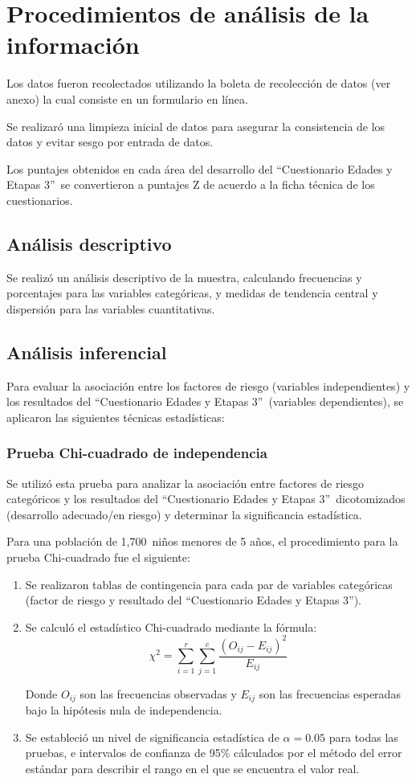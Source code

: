 \documentclass[11pt,letterpaper]{report}
\newcommand{\muestradeseada}{1,700}
\newcommand{\asq}{“Cuestionario Edades y Etapas 3”}
\begin{document}
\section{Procedimientos de análisis de la información}
Los datos fueron recolectados utilizando la boleta de recolección de datos (ver
anexo) la cual consiste en un formulario en línea.

Se realizaró una limpieza inicial de datos para asegurar la consistencia de los
datos y evitar sesgo por entrada de datos.

Los puntajes obtenidos en cada área del desarrollo del \asq\ se convertieron a
puntajes Z de acuerdo a la ficha técnica de los cuestionarios. 
	
\subsection{Análisis descriptivo}
Se realizó un análisis descriptivo de la muestra, calculando frecuencias y
porcentajes para las variables categóricas, y medidas de tendencia central y
dispersión para las variables cuantitativas.

\subsection{Análisis inferencial}
Para evaluar la asociación entre los factores de riesgo (variables
independientes) y los resultados del \asq\ (variables dependientes), se
aplicaron las siguientes técnicas estadísticas:

\subsubsection{Prueba Chi-cuadrado de independencia}
Se utilizó esta prueba para analizar la asociación entre factores de riesgo
categóricos y los resultados del \asq\ dicotomizados (desarrollo adecuado/en
riesgo) y determinar la significancia estadística.

Para una población de \muestradeseada\ niños menores de 5 años, el
procedimiento para la prueba Chi-cuadrado fue el siguiente:

\begin{enumerate}
    \item Se realizaron tablas de contingencia para cada par de variables
		categóricas (factor de riesgo y resultado del \asq).
    
    \item Se calculó el estadístico Chi-cuadrado mediante la fórmula:
    \[
    \chi^2 = \sum_{i=1}^r \sum_{j=1}^c \frac{(O_{ij} - E_{ij})^2}{E_{ij}}
    \]
    
    Donde \( O_{ij} \) son las frecuencias observadas y \( E_{ij} \) son las
	frecuencias esperadas bajo la hipótesis nula de independencia.
    
    \item Se estableció un nivel de significancia estadística de $\alpha = 0.05$
		para todas las pruebas, e intervalos de confianza de 95\% cálculados
		por el método del error estándar para describir el rango en el que se
		encuentra el valor real.
\end{enumerate}
\end{document}
